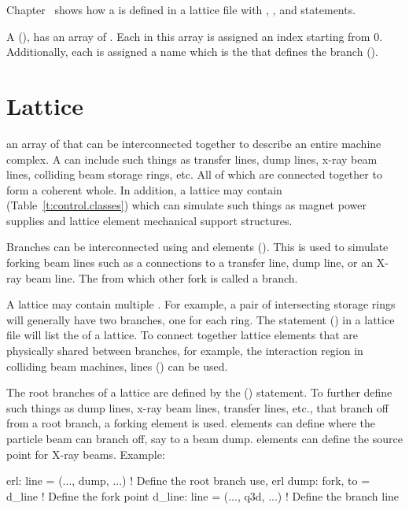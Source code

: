 Chapter~ shows how a  is defined in a lattice file with ,
, and  statements.

A  (), has an array of . Each  in this array
is assigned an index starting from 0. Additionally, each  is assigned a name which is the
 that defines the branch ().

\section{Lattice}
\label{s:lattice.def}

an array of  that can be interconnected together to describe an entire machine
complex. A  can include such things as transfer lines, dump lines, x-ray beam lines,
colliding beam storage rings, etc. All of which are connected together to form a coherent whole. In
addition, a lattice may contain  (Table~\ref{t:control.classes}) which can
simulate such things as magnet power supplies and lattice element mechanical support structures.

Branches can be interconnected using  and  elements (). This
is used to simulate forking beam lines such as a connections to a transfer line, dump line, or an
X-ray beam line. The  from which other  fork is called a  branch.

A lattice may contain multiple  . For example, a pair of intersecting storage
rings will generally have two  branches, one for each ring. The  statement
() in a lattice file will list the   of a lattice. To connect
together lattice elements that are physically shared between branches, for example, the interaction
region in colliding beam machines,  lines () can be used.

The root branches of a lattice are defined by the  () statement. To further
define such things as dump lines, x-ray beam lines, transfer lines, etc., that branch off from a
root branch, a forking element is used.   elements can define where the particle beam can
branch off, say to a beam dump.  elements can define the source point for X-ray
beams.  Example:
\begin{example}
  erl: line = (..., dump, ...)               ! Define the root branch 
  use, erl
  dump: fork, to = d_line                    ! Define the fork point
  d_line: line = (..., q3d, ...)             ! Define the branch line
\end{example}

